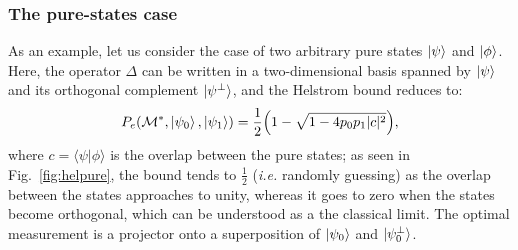 \subsubsection{The pure-states case}
As an example, let us consider the case of two arbitrary pure states $\ket{\psi}$ and $\ket{\phi}$. Here, the operator $\Delta$ can be written in a two-dimensional basis spanned by $\ket{\psi}$ and its orthogonal complement $\ket{{\psi}^\perp}$, and the Helstrom bound reduces to:
\begin{align}\label{eq:helstrom_pure}
P_e(\mathcal{M}^*, \ket{\psi_0}, \ket{\psi_1}) = \frac{1}{2}\Big(1 - \sqrt{1 - 4 p_0 p_1 |c|^2}\Big),
\end{align}
where $c = \langle \psi | \phi\rangle$ is the overlap between the pure states; as seen in Fig.~\ref{fig:helpure}, the bound tends to $\frac{1}{2}$ (\textit{i.e.} randomly guessing) as the overlap between the states approaches to unity, whereas it goes to zero when the states become orthogonal, which can be understood as a the classical limit. The optimal measurement is a projector onto a superposition of $\ket{\psi_0}$ and $\ket{\psi_0^\perp}$.

